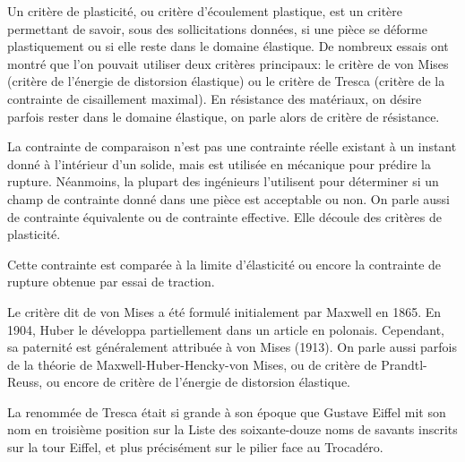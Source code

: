 \begin{histoire}
Un critère de plasticité, ou critère d'écoulement plastique, est un critère permettant de savoir, sous des sollicitations données,
si une pièce se déforme plastiquement ou si elle reste dans le domaine élastique.
De nombreux essais ont montré que l'on pouvait utiliser deux critères principaux: le critère de von Mises
(critère de l'énergie de distorsion élastique) ou le critère de Tresca
(critère de la contrainte de cisaillement maximal).
En résistance des matériaux, on désire parfois rester dans le domaine élastique, on parle alors de critère de résistance.

La contrainte de comparaison n'est pas une contrainte réelle existant à un instant donné à l'intérieur d'un solide, mais est utilisée
en mécanique pour prédire la rupture. Néanmoins, la plupart des ingénieurs l'utilisent pour déterminer si un champ de contrainte
donné dans une pièce est acceptable ou non. On parle aussi de contrainte équivalente ou de contrainte effective. Elle découle des
critères de plasticité.

Cette contrainte est comparée à la limite d'élasticité ou encore la contrainte de rupture obtenue par essai de traction.

\medskip
Le critère dit de von Mises
a été formulé initialement par Maxwell en 1865.
En 1904, Huber le développa partiellement dans un
article en polonais.
Cependant, sa paternité est généralement attribuée à von Mises (1913).
On parle aussi parfois de la théorie de Maxwell-Huber-Hencky-von Mises,
ou de critère de Prandtl-Reuss,
ou encore de critère de l'énergie de distorsion élastique.

\medskip
La renommée de Tresca
était si grande à son époque que Gustave Eiffel
mit son nom en troisième position sur la Liste des soixante-douze noms de savants inscrits sur la tour Eiffel,
et plus précisément sur le pilier face au Trocadéro.


\end{histoire}
